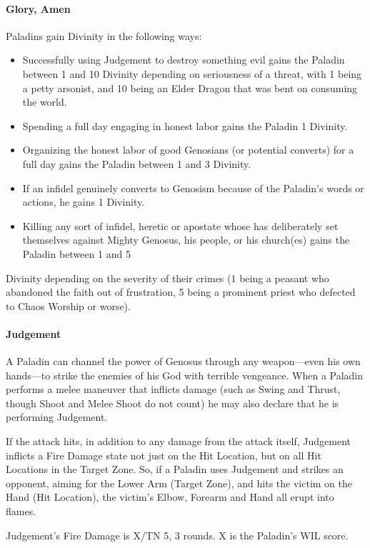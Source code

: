 \documentclass[oneside,11pt,english]{book}
\begin{document}
\paragraph{Glory, Amen}
Paladins gain Divinity in the following ways:
\begin{itemize}
\item Successfully using Judgement to destroy something evil gains the Paladin between 1 and 
10 Divinity depending on seriousness of a threat, with 1 being a petty arsonist, and 10 
being an Elder Dragon that was bent on consuming the world. 
\item Spending a full day engaging in honest labor gains the Paladin 1 Divinity. 
\item Organizing the honest labor of good Genosians (or potential converts) for a full day gains 
the Paladin between 1 and 3 Divinity. 
\item If an infidel genuinely converts to Genosism because of the Paladin's words or actions, he 
gains 1 Divinity. 
\item Killing any sort of infidel, heretic or apostate whose has deliberately set themselves 
against Mighty Genosus, his people, or his church(es) gains the Paladin between 1 and 5 
\end{itemize}
Divinity depending on the severity of their crimes (1 being a peasant who abandoned the faith out of frustration, 5 being a prominent priest who defected to Chaos Worship or worse).
\paragraph{Judgement}
A Paladin can channel the power of Genosus through any weapon—even his own hands—to strike the enemies of his God with terrible vengeance. When a Paladin performs a melee maneuver that inflicts damage (such as Swing and Thrust, though Shoot and Melee Shoot do not count) he may also declare that he is performing Judgement.\par


If the attack hits, in addition to any damage from the attack itself, Judgement inflicts a Fire Damage state not just on the Hit Location, but on all Hit Locations in the Target Zone. So, if a Paladin uses Judgement and strikes an opponent, aiming for the Lower Arm (Target Zone), and hits the victim on the Hand (Hit Location), the victim's Elbow, Forearm and Hand all erupt into flames.


Judgement's Fire Damage is X/TN 5, 3 rounds. X is the Paladin's WIL score.
\end{document}
